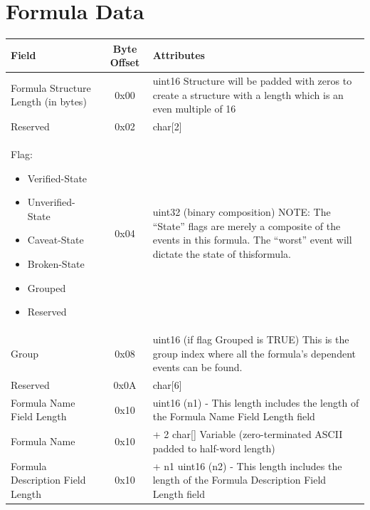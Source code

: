 \documentclass[14]{article}
\begin{document}
\pagebreak

\section{Formula Data}
\begin{tabular}[l]{|p{5cm}|c|p{7cm}|}
  \hline
  \textbf{Field} & \textbf{Byte Offset} & \textbf{Attributes} \\
  \hline
  
  Formula Structure Length (in bytes) & 0x00 & uint16 Structure will be padded with
                                               zeros to create a structure with
                                               a length which is an even
                                               multiple of 16 \\ \hline
  Reserved & 0x02 & char[2] \\ \hline
  \parbox[t]{5cm} {
  Flag:
  \begin{itemize}
    \renewcommand\labelitemi{--}
    \setlength\itemsep{-0.4em}
  \item Verified-State
  \item Unverified-State
  \item Caveat-State
  \item Broken-State
  \item Grouped
  \item Reserved
  \end{itemize}
  } & 0x04 & uint32 (binary composition) NOTE: The ``State'' flags are
             merely a composite of the events in this formula. The “worst”
             event will dictate the state of thisformula. \\ \hline
  Group & 0x08 & uint16 (if flag Grouped is TRUE) This is the group index where
                 all the formula's dependent events can be found. \\ \hline
  Reserved & 0x0A & char[6] \\ \hline
  Formula Name Field Length & 0x10 & uint16 (n1) - This length includes the
                                     length of the Formula Name Field Length
                                     field \\ \hline
  Formula Name & 0x10 & + 2 char[] Variable (zero-terminated ASCII padded to
                        half-word length) \\ \hline
  Formula Description Field Length & 0x10 & + n1 uint16 (n2) - This length
                                            includes the length of the Formula
                                            Description Field Length field \\

\end{tabular}
\end{document}
